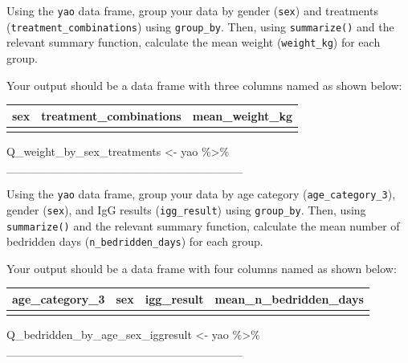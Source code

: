 \documentclass[
  letterpaper,
  DIV=11,
  numbers=noendperiod]{scrreprt}
\newenvironment{Shaded}{\begin{snugshade}}{\end{snugshade}}
\newcommand{\NormalTok}[1]{\textcolor[rgb]{0.00,0.23,0.31}{#1}}
\newcommand{\OtherTok}[1]{\textcolor[rgb]{0.00,0.23,0.31}{#1}}
\newcommand{\SpecialCharTok}[1]{\textcolor[rgb]{0.37,0.37,0.37}{#1}}
\begin{document}
\begin{tcolorbox}[enhanced jigsaw, colframe=quarto-callout-tip-color-frame, rightrule=.15mm, opacityback=0, breakable, coltitle=black, colbacktitle=quarto-callout-tip-color!10!white, bottomrule=.15mm, leftrule=.75mm, toprule=.15mm, arc=.35mm, bottomtitle=1mm, colback=white, left=2mm, opacitybacktitle=0.6, titlerule=0mm, title=\textcolor{quarto-callout-tip-color}{\faLightbulb}\hspace{0.5em}{Practice}, toptitle=1mm]

Using the \texttt{yao} data frame, group your data by gender
(\texttt{sex}) and treatments (\texttt{treatment\_combinations}) using
\texttt{group\_by}. Then, using \texttt{summarize()} and the relevant
summary function, calculate the mean weight (\texttt{weight\_kg}) for
each group.

Your output should be a data frame with three columns named as shown
below:

\begin{longtable}[]{@{}lll@{}}
\toprule\noalign{}
sex & treatment\_combinations & mean\_weight\_kg \\
\midrule\noalign{}
\endhead
\bottomrule\noalign{}
\endlastfoot
& & \\
\end{longtable}

\begin{Shaded}
\begin{Highlighting}[]
\NormalTok{Q\_weight\_by\_sex\_treatments }\OtherTok{\textless{}{-}} 
\NormalTok{  yao }\SpecialCharTok{\%\textgreater{}\%}
\NormalTok{  \_\_\_\_\_\_\_\_\_\_\_\_\_\_\_\_\_\_\_\_\_\_\_\_\_\_\_\_}
\end{Highlighting}
\end{Shaded}

Using the \texttt{yao} data frame, group your data by age category
(\texttt{age\_category\_3}), gender (\texttt{sex}), and IgG results
(\texttt{igg\_result}) using \texttt{group\_by}. Then, using
\texttt{summarize()} and the relevant summary function, calculate the
mean number of bedridden days (\texttt{n\_bedridden\_days}) for each
group.

Your output should be a data frame with four columns named as shown
below:

\begin{longtable}[]{@{}llll@{}}
\toprule\noalign{}
age\_category\_3 & sex & igg\_result & mean\_n\_bedridden\_days \\
\midrule\noalign{}
\endhead
\bottomrule\noalign{}
\endlastfoot
& & & \\
\end{longtable}

\begin{Shaded}
\begin{Highlighting}[]
\NormalTok{Q\_bedridden\_by\_age\_sex\_iggresult }\OtherTok{\textless{}{-}} 
\NormalTok{  yao }\SpecialCharTok{\%\textgreater{}\%}
\NormalTok{  \_\_\_\_\_\_\_\_\_\_\_\_\_\_\_\_\_\_\_\_\_\_\_\_\_\_\_\_}
\end{Highlighting}
\end{Shaded}

\end{tcolorbox}
\end{document}
